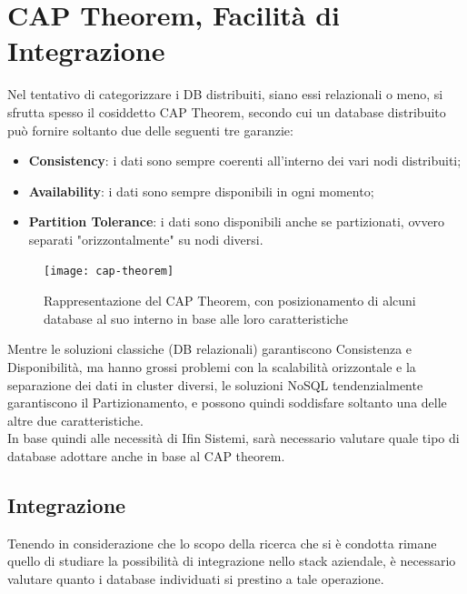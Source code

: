 \section{CAP Theorem, Facilità di Integrazione}
\label{sec:cap-theorem-integrazione}

Nel tentativo di categorizzare i DB distribuiti, siano essi relazionali o meno, si sfrutta spesso il cosiddetto CAP Theorem, secondo cui un database distribuito può fornire soltanto due delle seguenti tre garanzie:
\begin{itemize}
    \item \textbf{Consistency}: i dati sono sempre coerenti all'interno dei vari nodi distribuiti;
    \item \textbf{Availability}: i dati sono sempre disponibili in ogni momento;
    \item \textbf{Partition Tolerance}: i dati sono disponibili anche se partizionati, ovvero separati "orizzontalmente" su nodi diversi.
\end{itemize}

\vspace{10pt}
\begin{figure}[htbp]
\begin{center}
\texttt{[image: cap-theorem]}
\caption{Rappresentazione del CAP Theorem, con posizionamento di alcuni database al suo interno in base alle loro caratteristiche}
\end{center}
\end{figure}
\vspace{10pt} 

\noindent Mentre le soluzioni classiche (DB relazionali) garantiscono Consistenza e Disponibilità, ma hanno grossi problemi con la scalabilità orizzontale e la separazione dei dati in cluster diversi, le soluzioni NoSQL tendenzialmente garantiscono il Partizionamento, e possono quindi soddisfare soltanto una delle altre due caratteristiche.\\

\noindent In base quindi alle necessità di Ifin Sistemi, sarà necessario valutare quale tipo di database adottare anche in base al CAP theorem.

\subsection{Integrazione}
Tenendo in considerazione che lo scopo della ricerca che si è condotta rimane quello di studiare la possibilità di integrazione nello stack aziendale, è necessario valutare quanto i database individuati si prestino a tale operazione.\\

